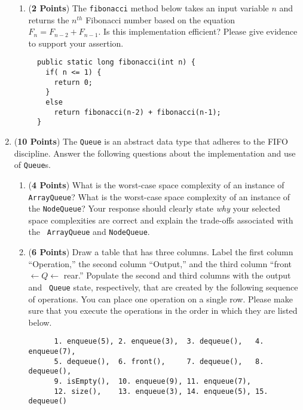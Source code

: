 \documentclass[12pt]{article}
\begin{document}
\begin{enumerate}
\begin{enumerate}
  \item ({\bf 2 Points}) The \texttt{fibonacci} method below takes an input variable $n$ and returns the $n^{th}$
  Fibonacci number based on the equation $F_n = F_{n-2} + F_{n-1}$. Is this implementation efficient?  Please give
  evidence to support your assertion.

{\small \begin{verbatim}
  public static long fibonacci(int n) {
    if( n <= 1) {
      return 0;
    }
    else
      return fibonacci(n-2) + fibonacci(n-1);
  }
\end{verbatim}}

\end{enumerate}

\newpage

\item ({\bf 10 Points}) The {\tt Queue} is an abstract data type that
  adheres to the FIFO discipline.  Answer the following questions
  about the implementation and use of {\tt Queue}s.

  \begin{enumerate}

  \item ({\bf 4 Points}) What is the worst-case space complexity of an
    instance of {\tt ArrayQueue}?  What is the worst-case space
    complexity of an instance of the {\tt NodeQueue}?  Your response
    should clearly state {\em why} your selected space complexities
    are correct and explain the trade-offs associated with the {\tt
      ArrayQueue} and {\tt NodeQueue}.

  \item ({\bf 6 Points}) Draw a table that has three columns.  Label
    the first column ``Operation,'' the second column ``Output,'' and
    the third column ``front $\leftarrow Q \leftarrow$ rear.''
    Populate the second and third columns with the output and {\tt
    Queue} state, respectively, that are created by the following
    sequence of operations.  You can place one operation on a single
    row. Please make sure that you execute the operations in the order
    in which they are listed below.

    \begin{verbatim}
      1. enqueue(5), 2. enqueue(3),  3. dequeue(),   4. enqueue(7),
      5. dequeue(),  6. front(),     7. dequeue(),   8. dequeue(),
      9. isEmpty(),  10. enqueue(9), 11. enqueue(7),
      12. size(),    13. enqueue(3), 14. enqueue(5), 15. dequeue()
    \end{verbatim}


\end{enumerate}
\end{enumerate}
\end{document}
